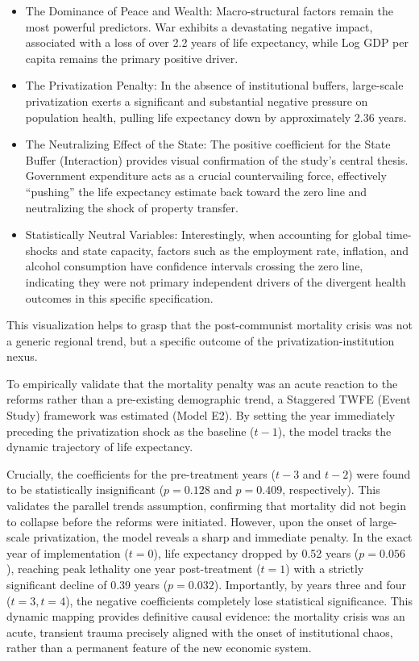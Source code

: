 \documentclass[en,magisterska]{pracamgr}
\begin{document}
\begin{itemize}
    \item The Dominance of Peace and Wealth: Macro-structural factors remain the most powerful predictors. War exhibits a devastating negative impact, associated with a loss 
    of over 2.2 years of life expectancy, while Log GDP per capita remains the primary positive driver.
    \item The Privatization Penalty: In the absence of institutional buffers, large-scale privatization exerts a significant and substantial negative pressure on population 
    health, pulling life expectancy down by approximately 2.36 years.
    \item The Neutralizing Effect of the State: The positive coefficient for the State Buffer (Interaction) provides visual confirmation of the study's central thesis. 
    Government expenditure acts as a crucial countervailing force, effectively ``pushing'' the life expectancy estimate back toward the zero line and neutralizing the shock of 
    property transfer.
    \item Statistically Neutral Variables: Interestingly, when accounting for global time-shocks and state capacity, factors such as the employment rate, inflation, and 
    alcohol consumption have confidence intervals crossing the zero line, indicating they were not primary independent drivers of the divergent health outcomes in this specific 
    specification.
\end{itemize}

This visualization helps to grasp that the post-communist mortality crisis was not a generic regional trend, but a specific outcome of the privatization-institution nexus.


To empirically validate that the mortality penalty was an acute reaction to the reforms rather than a pre-existing demographic trend, a Staggered TWFE (Event Study) framework was 
estimated (Model E2). By setting the year immediately preceding the privatization shock as the baseline ($t-1$), the model tracks the dynamic trajectory of life expectancy.

Crucially, the coefficients for the pre-treatment years ($t-3$ and $t-2$) were found to be statistically insignificant ($p = 0.128$ and $p = 0.409$, respectively). This validates 
the parallel trends assumption, confirming that mortality did not begin to collapse before the reforms were initiated. However, upon the onset of large-scale privatization, the model 
reveals a sharp and immediate penalty. In the exact year of implementation ($t=0$), life expectancy dropped by 0.52 years ($p = 0.056$), reaching peak lethality one year post-treatment 
($t=1$) with a strictly significant decline of 0.39 years ($p = 0.032$). Importantly, by years three and four ($t=3, t=4$), the negative coefficients completely lose statistical 
significance. This dynamic mapping provides definitive causal evidence: the mortality crisis was an acute, transient trauma precisely aligned with the onset of institutional chaos, 
rather than a permanent feature of the new economic system.
\end{document}
